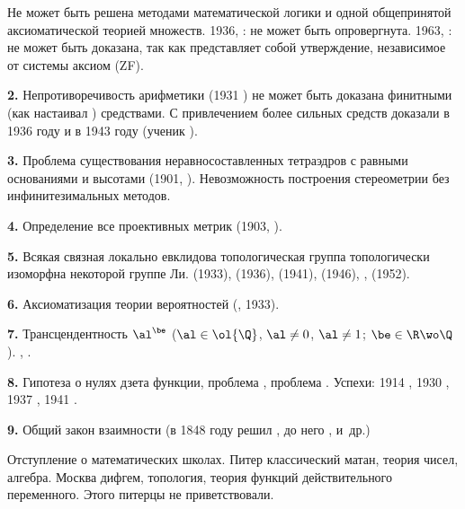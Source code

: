 \documentclass[a4paper,oneside,fleqn,10pt]{article}
\begin{document}
Не может быть решена методами математической логики и одной
общепринятой аксиоматической теорией множеств. 1936, : не
может быть опровергнута.  1963, : не может быть доказана,
так как представляет собой утверждение, независимое от системы аксиом
  (ZF).

\medskip

\textbf{2.} Непротиворечивость арифметики (1931 ) не
может быть доказана финитными (как настаивал )
средствами. С привлечением более сильных средств доказали в 1936 году
 и в 1943 году  (ученик
).

\medskip

\textbf{3.} Проблема существования неравносоставленных тетраэдров с
равными основаниями и высотами (1901, ).  Невозможность
построения стереометрии без инфинитезимальных методов.

\medskip

\textbf{4.} Определение все проективных метрик (1903, ).

\medskip

\textbf{5.} Всякая связная локально евклидова топологическая группа
топологически изоморфна некоторой группе Ли.  (1933),  (1936), 
(1941),  (1946), , 
(1952).

\medskip

\textbf{6.} Аксиоматизация теории вероятностей (,
1933).

\medskip

\textbf{7.} Трансцендентность $\al^\be$ ($\al \in \ol{\Q}$, $\al \ne
0$, $\al \ne 1$; $\be \in \R\wo\Q$).  , .

\medskip

\textbf{8.} Гипотеза  о нулях дзета функции,
проблема , проблема .
Успехи: 1914 , 1930 , 1937
, 1941 .

\medskip

\textbf{9.} Общий закон взаимности (в 1848 году решил
, до него ,  и~др.)

\medskip

Отступление о математических школах. Питер классический матан, теория
чисел, алгебра.  Москва дифгем, топология, теория функций
действительного переменного.  Этого питерцы не приветствовали.
\end{document}
